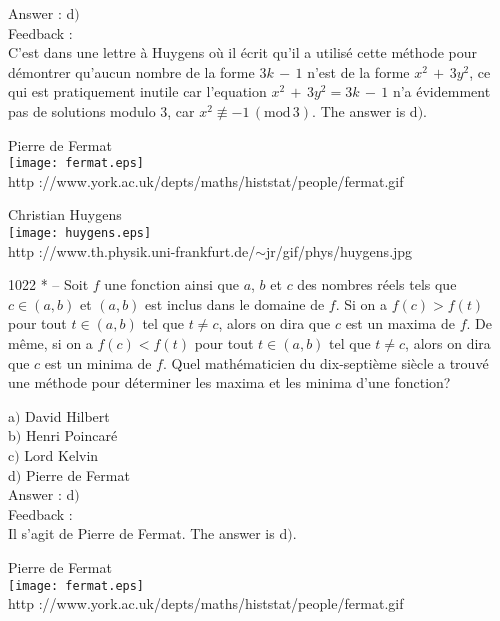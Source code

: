 ﻿\documentclass[letterpaper, 12pt]{article}
\begin{document}
Answer : d$)$\\

Feedback : \\
C'est dans une lettre \`a Huygens o\`u il \'ecrit qu'il a utilis\'e
cette m\'ethode pour d\'emontrer qu'aucun nombre de la forme
$3k\,-\,1$ n'est de la forme $x^2\,+\,3y^2$, ce qui est pratiquement
inutile car l'equation $x^2\,+\,3y^2=3k\,-\,1$ n'a \'evidemment
pas de solutions modulo $3$, car $x^2\not
\equiv-1\,(\mathrm{mod}\,3)$.
The answer is d$)$.\\

        \begin{center}
        Pierre de Fermat\\
    \texttt{[image: fermat.eps]}\\
        {\footnotesize http
://www.york.ac.uk/depts/maths/histstat/people/fermat.gif}
    \end{center}

        \begin{center}
        Christian Huygens\\
    \texttt{[image: huygens.eps]}\\
        {\footnotesize http
://www.th.physik.uni-frankfurt.de/$\sim$jr/gif/phys/huygens.jpg}
    \end{center}

1022 * -- Soit $f$ une fonction ainsi que $a$, $b$ et $c$ des
nombres r\'eels tels que $c\in(a,b)$ et $(a,b)$ est inclus dans le
domaine de $f$. Si on a $f(c)>f(t)$ pour tout $t\in(a,b)$ tel que
$t\not=c$, alors on dira que $c$ est un maxima de $f$. De m\^eme, si
on a $f(c)<f(t)$ pour tout $t\in(a,b)$ tel que $t\not=c$, alors on
dira que $c$ est un minima de $f$. Quel math\'ematicien du
dix-septi\`eme si\`ecle a trouv\'e une m\'ethode pour d\'eterminer
les maxima et les minima d'une fonction?

a$)$ David Hilbert \\
b$)$ Henri Poincar\'e \\
c$)$ Lord Kelvin \\
d$)$ Pierre de Fermat \\

Answer : d$)$\\

Feedback : \\
Il s'agit de Pierre de Fermat.
The answer is d$)$.\\

        \begin{center}
        Pierre de Fermat\\
    \texttt{[image: fermat.eps]}\\
        {\footnotesize http
://www.york.ac.uk/depts/maths/histstat/people/fermat.gif}
    \end{center}
\end{document}
